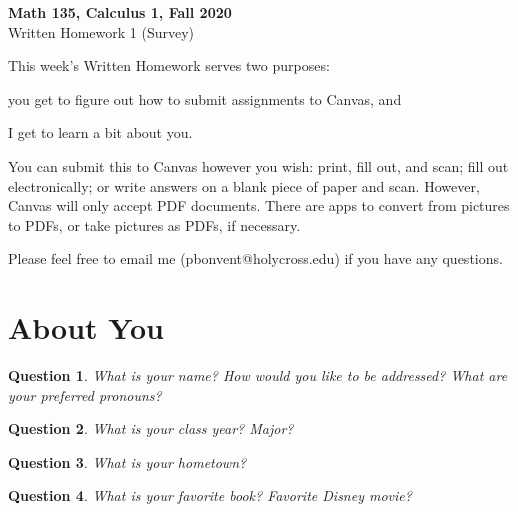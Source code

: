 \documentclass[11pt,reqno,final]{amsart}
\numberwithin{equation}{section}
\numberwithin{figure}{section}
\newtheorem{question}{Question}
\theoremstyle{definition} %
\begin{document}
\begin{center}
        \textbf{\Large Math 135, Calculus 1, Fall 2020}\\[10pt]
        {\large Written Homework 1 (Survey)}
\end{center}

\thispagestyle{empty}

\renewcommand{\thesection}{\Alph{section}}

This week's Written Homework serves two purposes:
\begin{enumerate*}[(a)]
\item you get to figure out how to submit assignments to Canvas, and
\item I get to learn a bit about you.
\end{enumerate*}
You can submit this to Canvas however you wish:
print, fill out, and scan;
fill out electronically;
or write answers on a blank piece of paper and scan.
However, Canvas will only accept PDF documents. There are apps to convert from pictures to PDFs, or take pictures as PDFs, if necessary.

Please feel free to email me ({\color{blue}pbonvent@holycross.edu}) if you have any questions.

\section{About You}

\begin{question}
        What is your name? How would you like to be addressed? What are your preferred pronouns?\\ $ $\\
\end{question}

\begin{question}
        What is your class year? Major? \\ $ $\\
\end{question}

\begin{question}
        What is your hometown? \\ $ $\\
\end{question}

\begin{question}
        What is your favorite book? Favorite Disney movie?\\ $ $\\
\end{question}
\end{document}
